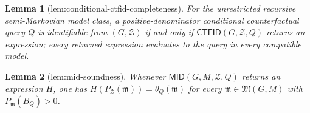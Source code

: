 \documentclass{article}
\newtheorem{lemma}{Lemma}
\begin{document}
\begin{lemma}[lem:conditional-ctfid-completeness]\label{lem:conditional-ctfid-completeness}
For the unrestricted recursive semi-Markovian model class, a positive-denominator conditional counterfactual query \(Q\) is identifiable from \((G,\mathcal Z)\) if and only if \(\mathsf{CTFID}(G,\mathcal Z,Q)\) returns an expression; every returned expression evaluates to the query in every compatible model.
\end{lemma}

\begin{lemma}[lem:mid-soundness]\label{lem:mid-soundness}
Whenever \(\mathsf{MID}(G,M,\mathcal Z,Q)\) returns an expression \(H\), one has \(H(P_{\mathcal Z}(\mathfrak m))=\theta_Q(\mathfrak m)\) for every \(\mathfrak m\in\mathfrak M(G,M)\) with \(P_{\mathfrak m}(B_Q)>0\).
\end{lemma}
\end{document}
